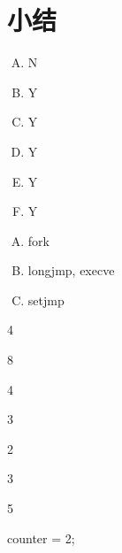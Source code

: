
\section{小结}
{
    \begin{practicec}
        \begin{enumerate}[A.]
            \item N
            \item Y
            \item Y
            \item Y
            \item Y
            \item Y
        \end{enumerate}
    \end{practicec}

    \begin{practicec}
        \begin{enumerate}[A.]
            \item fork
            \item longjmp, execve
            \item setjmp
        \end{enumerate}
    \end{practicec}

    \begin{practicec}
        4
    \end{practicec}

    \begin{practicec}
        8
    \end{practicec}

    \begin{practicec}
        4

        3

        2
    \end{practicec}

    \begin{practicec}
        3
    \end{practicec}

    \begin{practicec}
        5
    \end{practicec}

    \begin{practicec}
        counter = 2;
    \end{practicec}

}
